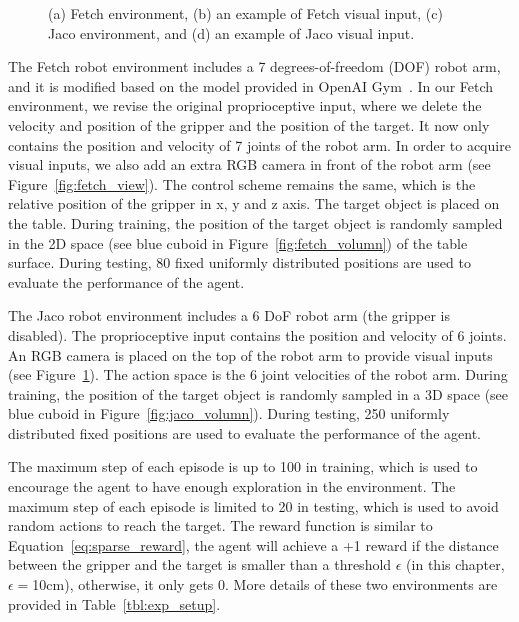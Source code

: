 \begin{figure}[h!]
\begin{subfigure}{0.24\columnwidth}
    \label{fig:jaco_view}
  \end{subfigure}
  \caption{(a) Fetch environment, (b) an example of Fetch visual input, (c) Jaco environment, and (d) an example of Jaco visual input. }
  \label{fig:robot_setups}
\end{figure}

The Fetch robot environment includes a 7 degrees-of-freedom (DOF) robot arm, and it is modified based on the model provided in OpenAI Gym~\cite{plappert2018multi}. In our Fetch environment, we revise the original proprioceptive input, where we delete the velocity and position of the gripper and the position of the target. It now only contains the position and velocity of 7 joints of the robot arm. In order to acquire visual inputs, we also add an extra RGB camera in front of the robot arm (see Figure~\ref{fig:fetch_view}). The control scheme remains the same, which is the relative position of the gripper in x, y and z axis. The target object is placed on the table. During training, the position of the target object is randomly sampled in the 2D space (see blue cuboid in Figure~\ref{fig:fetch_volumn}) of the table surface. During testing, 80 fixed uniformly distributed positions are used to evaluate the performance of the agent.

The Jaco robot environment includes a 6 DoF robot arm (the gripper is disabled). The proprioceptive input contains the position and velocity of 6 joints. An RGB camera is placed on the top of the robot arm to provide visual inputs (see Figure~\ref{fig:jaco_view}). The action space is the 6 joint velocities of the robot arm. During training, the position of the target object is randomly sampled in a 3D space (see blue cuboid in Figure~\ref{fig:jaco_volumn}). During testing, 250 uniformly distributed fixed positions are used to evaluate the performance of the agent.

The maximum step of each episode is up to 100 in training, which is used to encourage the agent to have enough exploration in the environment. The maximum step of each episode is limited to 20 in testing, which is used to avoid random actions to reach the target. The reward function is similar to Equation~\eqref{eq:sparse_reward}, the agent will achieve a +1 reward if the distance between the gripper and the target is smaller than a threshold $\epsilon$ (in this chapter, $\epsilon=$10cm), otherwise, it only gets 0. More details of these two environments are provided in Table~\ref{tbl:exp_setup}.

